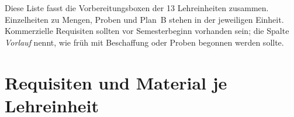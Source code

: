 Diese Liste fasst die Vorbereitungsboxen der 13 Lehreinheiten zusammen.
Einzelheiten zu Mengen, Proben und Plan~B stehen in der jeweiligen
Einheit. Kommerzielle Requisiten sollten vor Semesterbeginn vorhanden sein;
die Spalte \emph{Vorlauf} nennt, wie früh mit Beschaffung oder Proben
begonnen werden sollte.

\section{Requisiten und Material je Lehreinheit}

